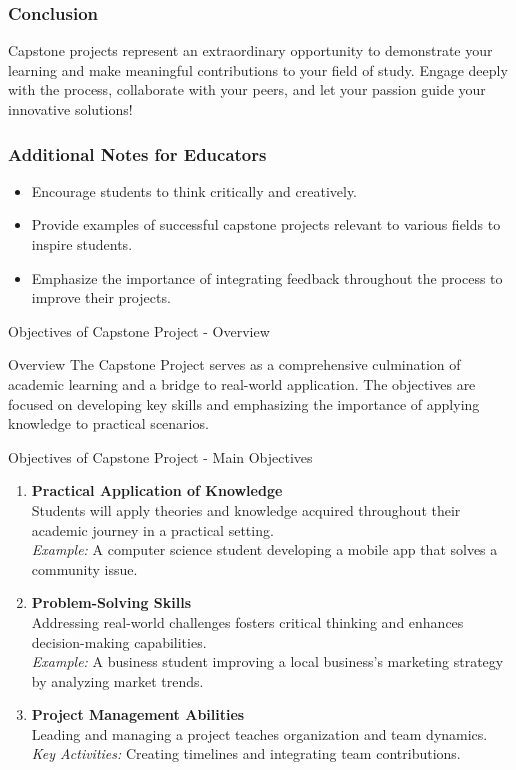 \documentclass[aspectratio=169]{beamer}
\begin{document}
\begin{frame}[fragile]
    \frametitle{Conclusion}
    Capstone projects represent an extraordinary opportunity to demonstrate your learning and make meaningful contributions to your field of study. Engage deeply with the process, collaborate with your peers, and let your passion guide your innovative solutions!
\end{frame}

\begin{frame}[fragile]
    \frametitle{Additional Notes for Educators}
    \begin{itemize}
        \item Encourage students to think critically and creatively.
        \item Provide examples of successful capstone projects relevant to various fields to inspire students.
        \item Emphasize the importance of integrating feedback throughout the process to improve their projects.
    \end{itemize}
\end{frame}

\begin{frame}[fragile]{Objectives of Capstone Project - Overview}
    \begin{block}{Overview}
        The Capstone Project serves as a comprehensive culmination of academic learning and a bridge to real-world application. The objectives are focused on developing key skills and emphasizing the importance of applying knowledge to practical scenarios.
    \end{block}
\end{frame}

\begin{frame}[fragile]{Objectives of Capstone Project - Main Objectives}
    \begin{enumerate}
        \item \textbf{Practical Application of Knowledge}\\
            Students will apply theories and knowledge acquired throughout their academic journey in a practical setting.\\
            \textit{Example:} A computer science student developing a mobile app that solves a community issue.
            
        \item \textbf{Problem-Solving Skills}\\
            Addressing real-world challenges fosters critical thinking and enhances decision-making capabilities.\\
            \textit{Example:} A business student improving a local business's marketing strategy by analyzing market trends.
    
        \item \textbf{Project Management Abilities}\\
            Leading and managing a project teaches organization and team dynamics.\\
            \textit{Key Activities:} Creating timelines and integrating team contributions.
    \end{enumerate}
\end{frame}
\end{document}
